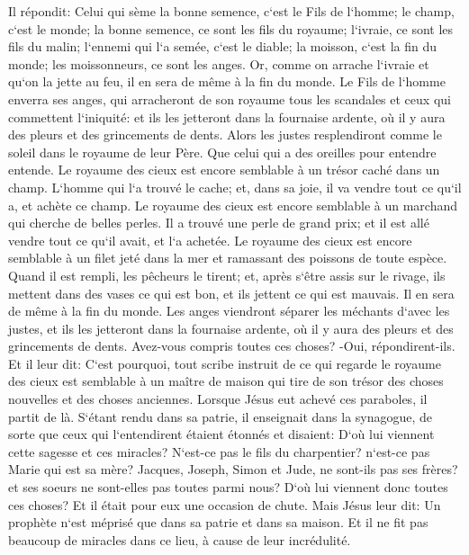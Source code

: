\verse Il répondit: Celui qui sème la bonne semence, c`est le Fils de l`homme; 
\verse le champ, c`est le monde; la bonne semence, ce sont les fils du royaume; l`ivraie, ce sont les fils du malin; 
\verse l`ennemi qui l`a semée, c`est le diable; la moisson, c`est la fin du monde; les moissonneurs, ce sont les anges. 
\verse Or, comme on arrache l`ivraie et qu`on la jette au feu, il en sera de même à la fin du monde. 
\verse Le Fils de l`homme enverra ses anges, qui arracheront de son royaume tous les scandales et ceux qui commettent l`iniquité: 
\verse et ils les jetteront dans la fournaise ardente, où il y aura des pleurs et des grincements de dents. 
\verse Alors les justes resplendiront comme le soleil dans le royaume de leur Père. Que celui qui a des oreilles pour entendre entende. 
\verse Le royaume des cieux est encore semblable à un trésor caché dans un champ. L`homme qui l`a trouvé le cache; et, dans sa joie, il va vendre tout ce qu`il a, et achète ce champ. 
\verse Le royaume des cieux est encore semblable à un marchand qui cherche de belles perles. 
\verse Il a trouvé une perle de grand prix; et il est allé vendre tout ce qu`il avait, et l`a achetée. 
\verse Le royaume des cieux est encore semblable à un filet jeté dans la mer et ramassant des poissons de toute espèce. 
\verse Quand il est rempli, les pêcheurs le tirent; et, après s`être assis sur le rivage, ils mettent dans des vases ce qui est bon, et ils jettent ce qui est mauvais. 
\verse Il en sera de même à la fin du monde. Les anges viendront séparer les méchants d`avec les justes, 
\verse et ils les jetteront dans la fournaise ardente, où il y aura des pleurs et des grincements de dents. 
\verse Avez-vous compris toutes ces choses? -Oui, répondirent-ils. 
\verse Et il leur dit: C`est pourquoi, tout scribe instruit de ce qui regarde le royaume des cieux est semblable à un maître de maison qui tire de son trésor des choses nouvelles et des choses anciennes. 
\verse Lorsque Jésus eut achevé ces paraboles, il partit de là. 
\verse S`étant rendu dans sa patrie, il enseignait dans la synagogue, de sorte que ceux qui l`entendirent étaient étonnés et disaient: D`où lui viennent cette sagesse et ces miracles? 
\verse N`est-ce pas le fils du charpentier? n`est-ce pas Marie qui est sa mère? Jacques, Joseph, Simon et Jude, ne sont-ils pas ses frères? 
\verse et ses soeurs ne sont-elles pas toutes parmi nous? D`où lui viennent donc toutes ces choses? 
\verse Et il était pour eux une occasion de chute. Mais Jésus leur dit: Un prophète n`est méprisé que dans sa patrie et dans sa maison. 
\verse Et il ne fit pas beaucoup de miracles dans ce lieu, à cause de leur incrédulité. 


